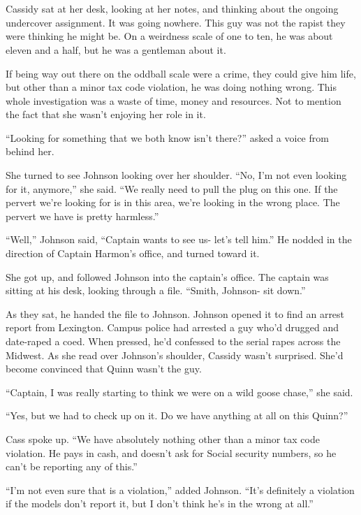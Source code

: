 \chapter{~}
Cassidy sat at her desk, looking at her notes, and thinking about the ongoing undercover
assignment. It was going nowhere. This guy was not the rapist they were thinking he might be. On
a weirdness scale of one to ten, he was about eleven and a half, but he was a gentleman about
it.

If being way out there on the oddball scale were a crime, they could give him life, but
other than a minor tax code violation, he was doing nothing wrong. This whole investigation was
a waste of time, money and resources. Not to mention the fact that she wasn't enjoying her role
in it.

``Looking for something that we both know isn't there?'' asked a voice from behind her.

She turned to see Johnson looking over her shoulder. ``No, I'm not even looking for it,
anymore,'' she said. ``We really need to pull the plug on this one. If the pervert we're looking
for is in this area, we're looking in the wrong place. The pervert we have is pretty harmless.''

``Well,'' Johnson said, ``Captain wants to see us- let's tell him.'' He nodded in the direction
of Captain Harmon's office, and turned toward it.

She got up, and followed Johnson into the captain's office. The captain was sitting at his
desk, looking through a file. ``Smith, Johnson- sit down.''

As they sat, he handed the file to Johnson. Johnson opened it to find an arrest report from
Lexington. Campus police had arrested a guy who'd drugged and date-raped a coed. When pressed,
he'd confessed to the serial rapes across the Midwest. As she read over Johnson's shoulder,
Cassidy wasn't surprised. She'd become convinced that Quinn wasn't the guy.

``Captain, I was really starting to think we were on a wild goose chase,'' she said.

``Yes, but we had to check up on it. Do we have anything at all on this Quinn?''

Cass spoke up. ``We have absolutely nothing other than a minor tax code violation. He pays
in cash, and doesn't ask for Social security numbers, so he can't be reporting any of this.''

``I'm not even sure that is a violation,'' added Johnson. ``It's definitely a violation if the
models don't report it, but I don't think he's in the wrong at all.''

